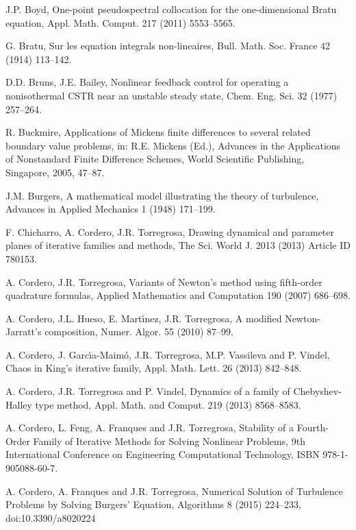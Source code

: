 \begin{thebibliography}{199}
 J.P. Boyd, One-point pseudospectral collocation for the one-dimensional Bratu equation, Appl. Math. Comput. 217 (2011) 5553--5565.

  G. Bratu, Sur les equation integrals non-lineaires, Bull. Math. Soc. France 42 (1914) 113--142.

   D.D. Bruns, J.E. Bailey, Nonlinear feedback control for operating a nonisothermal CSTR near an unstable steady state, {Chem. Eng. Sci.} 32 ({1977})  257--264.

 R. Buckmire, Applications of Mickens finite differences to several related boundary value problems, in: R.E. Mickens (Ed.), Advances in the Applications of Nonstandard Finite Difference Schemes, World Scientific Publishing, Singapore, 2005, 47--87.

 J.M. Burgers, A mathematical model illustrating the theory of turbulence, Advances in Applied Mechanics 1 (1948) 171--199.

 F. Chicharro, A. Cordero, J.R. Torregrosa,
Drawing dynamical and parameter planes of iterative families and
methods, The Sci. World J. 2013 (2013) Article ID 780153.

    A. Cordero, J.R. Torregrosa, Variants of Newton's method using fifth-order quadrature formulas, Applied Mathematics and Computation  190 (2007) 686--698.

 A. Cordero, J.L. Hueso, E. Mart\'{\i}nez, J.R. Torregrosa, A modified Newton-Jarratt's composition, Numer. Algor. 55 (2010) 87--99.

 A. Cordero, J. Garc\'{\i}a-Maim\'{o}, J.R. Torregrosa, M.P. Vassileva and P. Vindel,
Chaos in King's iterative family, Appl. Math. Lett. 26 (2013) 842--848.

 A. Cordero, J.R. Torregrosa and P. Vindel,
Dynamics of a family of Chebyshev-Halley type method,
Appl. Math. and Comput. 219 (2013) 8568--8583.

 A. Cordero, L. Feng, A. Franques and J.R. Torregrosa, Stability of a Fourth-Order Family of Iterative Methods for Solving Nonlinear
Problems, 9th International Conference on Engineering Computational
Technology, ISBN 978-1-905088-60-7.

 A. Cordero, A. Franques and J.R. Torregrosa, Numerical Solution of Turbulence Problems by Solving
Burgers’ Equation, Algorithms 8 (2015) 224--233, doi:10.3390/a8020224


\end{thebibliography}
